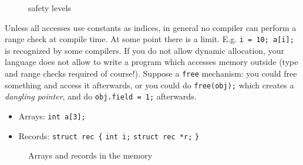 {{\begin{figure}[H]
			\caption{safety levels}
			\label{fig:safetylevels}
		\end{figure}
	}
	\par{
		\noindent
		Unless all accesses use constants as indices, in general no compiler can perform a range check at compile time. At some point there is a limit. E.g. \texttt{i = 10; a[i];} is recognized by some compilers. \newline
		If you do not allow dynamic allocation, your language does not allow to write a program which accesses memory outside (type and range checks required of course!). \newline
		Suppose a \texttt{free} mechanism: you could free something and access it afterwards, or you could do \texttt{free(obj);} which creates a \textit{dangling pointer}, and do \texttt{obj.field = 1;} afterwards.
	}
	\par{
		\noindent
		\begin{minipage}{0.45\textwidth}
			\begin{itemize}
				\item{
					Arrays: \newline
					\texttt{int a[3];} \newline\newline
				}
				\item{
					Records: \newline
					\texttt{struct rec \{} \newline
					\texttt{int i;} \newlinex
					\texttt{struct rec *r;} \newline	
					\texttt{\}} \newline\newline
				}
			\end{itemize}
		\end{minipage}%
		\begin{minipage}{0.45\textwidth}
			\begin{figure}[H]
				\centering
				\begin{tikzpicture}

				\end{tikzpicture}
				\caption{Arrays and records in the memory}
				\label{fig:arraysrecordsmem}
			\end{figure}
		\end{minipage}%
	}
}